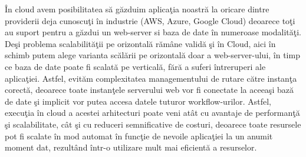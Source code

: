 \par În cloud avem posibilitatea să găzduim aplicaţia noastră la oricare dintre providerii deja cunoscuţi în industrie (AWS, Azure, Google Cloud) deoarece toţi au suport pentru a găzdui un web-server si baza de date în numeroase modalităţi. Deşi problema scalabilităţii pe orizontală rămâne validă şi în Cloud, aici în schimb putem alege varianta scălării pe orizontală doar a web-server-ului, în timp ce baza de date poate fi scalată pe verticală, fără a suferi întreruperi ale aplicaţiei. Astfel, evităm complexitatea managementului de rutare către instanţa corectă, deoarece toate instanţele serverului web vor fi conectate la aceeaşi bază de date şi implicit vor putea accesa datele tuturor workflow-urilor. Astfel, execuţia în cloud a acestei arhitecturi poate veni atât cu avantaje de performanţă şi scalabilitate, cât şi cu reduceri semnificative de costuri, deoarece toate resursele pot fi scalate în mod automat în funcţie de nevoile aplicaţiei la un anumit moment dat, rezultând într-o utilizare mult mai eficientă a resurselor. 
